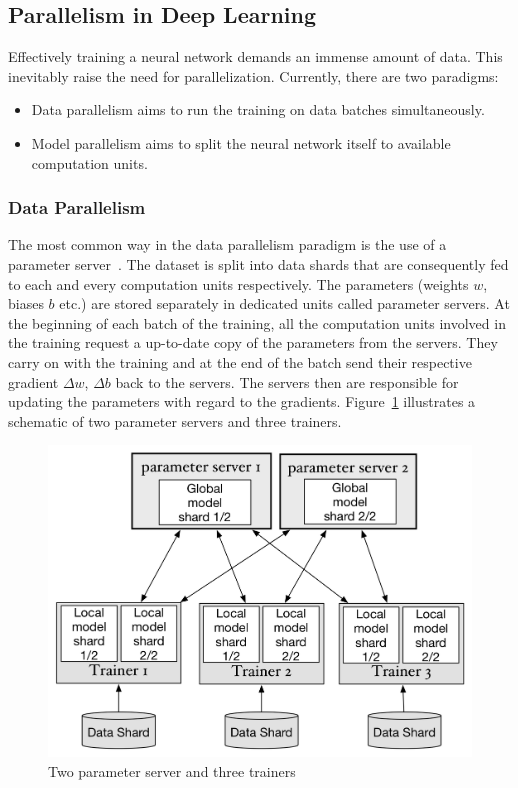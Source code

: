 \subsection{Parallelism in Deep Learning}
Effectively training a neural network demands an immense amount of data. This 
inevitably raise the need for parallelization. Currently, there are two 
paradigms:
\begin{itemize}
    \item Data parallelism aims to run the training on data batches 
        simultaneously.
    \item Model parallelism aims to split the neural network itself to available 
        computation units.
\end{itemize}

\subsubsection{Data Parallelism}
The most common way in the data parallelism paradigm is the use of a parameter 
server~\cite{pserver}. The dataset is split into data shards that are 
consequently fed to each and every computation units respectively. The 
parameters (weights $w$, biases $b$ etc.) are stored separately in dedicated 
units called parameter servers. At the beginning of each batch of the training, 
all the computation units involved in the training request a up-to-date copy of 
the parameters from the servers. They carry on with the training and at the end 
of the batch send their respective gradient $\Delta w$, $\Delta b$ back to the 
servers. The servers then are responsible for updating the parameters with 
regard to the gradients. Figure~\ref{fig:pserver} illustrates a schematic of two 
parameter servers and three trainers.
\begin{figure}[H]
    \centerline{\includegraphics[scale=0.40]{background/figs/data_parallelism.png}}
    \caption{Two parameter server and three trainers}
    \label{fig:pserver}
\end{figure}

